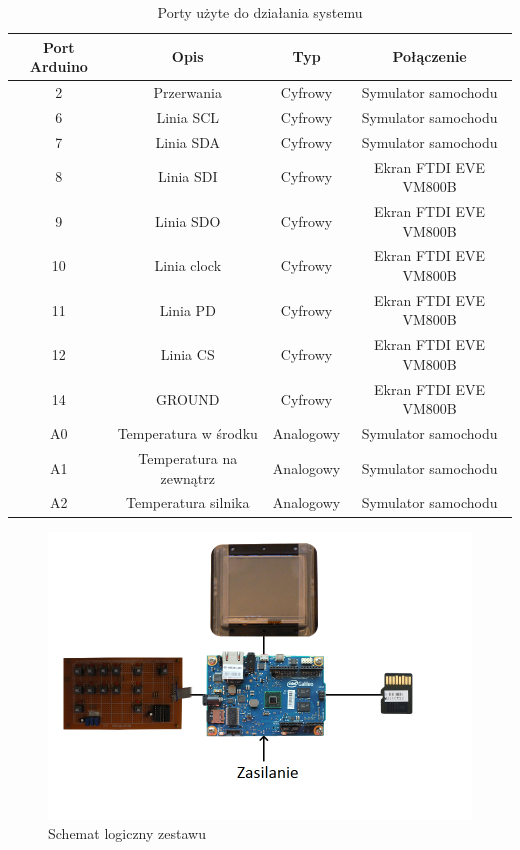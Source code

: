 \documentclass{xmgr}
\begin{document}
\begin{table}[!tbh]
\begin{tabular}{|c|c|c|c|} \hline
\textbf{Port Arduino} & \textbf{Opis} & \textbf{Typ} & \textbf{Połączenie} \\ \hline
	2 & Przerwania & Cyfrowy & Symulator samochodu\\ \hline
	6 & Linia SCL & Cyfrowy & Symulator samochodu\\ \hline
	7 & Linia SDA & Cyfrowy & Symulator samochodu\\ \hline
	8 & Linia SDI & Cyfrowy & Ekran FTDI EVE VM800B\\ \hline
	9 & Linia SDO & Cyfrowy & Ekran FTDI EVE VM800B\\ \hline
	10 & Linia clock & Cyfrowy & Ekran FTDI EVE VM800B\\ \hline
	11 & Linia PD & Cyfrowy & Ekran FTDI EVE VM800B\\ \hline
	12 & Linia CS & Cyfrowy & Ekran FTDI EVE VM800B\\ \hline
	14 & GROUND & Cyfrowy & Ekran FTDI EVE VM800B\\ \hline
	A0 & Temperatura w środku & Analogowy & Symulator samochodu\\ \hline
	A1 & Temperatura na zewnątrz & Analogowy & Symulator samochodu\\ \hline
	A2 & Temperatura silnika & Analogowy & Symulator samochodu\\ \hline
\end{tabular}
\caption{Porty użyte do działania systemu}
\end{table}

\begin{figure}[!h]
    \centering
    	\includegraphics[height=0.33\textheight]{images/schemat.png}
    \caption{Schemat logiczny zestawu}
\end{figure}
\end{document}
